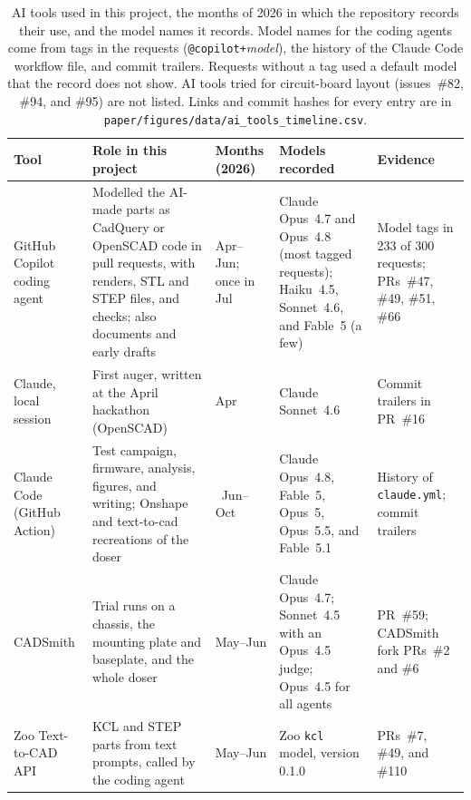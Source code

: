 \begin{table}[htbp]
\centering
\small
\caption{AI tools used in this project, the months of 2026 in which the
repository records their use, and the model names it records. Model names for
the coding agents come from tags in the requests (\texttt{@copilot+}\emph{model}),
the history of the Claude Code workflow file, and commit trailers. Requests
without a tag used a default model that the record does not show. AI tools tried
for circuit-board layout (issues~\#82, \#94, and \#95) are not listed. Links and
commit hashes for every entry are in
\texttt{paper/figures/data/ai\_tools\_timeline.csv}.}
\label{tbl:aitools}
\begin{tabular}{>{\raggedright\arraybackslash}p{2.5cm}>{\raggedright\arraybackslash}p{4.2cm}>{\raggedright\arraybackslash}p{1.7cm}>{\raggedright\arraybackslash}p{3.4cm}>{\raggedright\arraybackslash}p{2.5cm}}
\toprule
Tool & Role in this project & Months (2026) & Models recorded & Evidence \\
\midrule
GitHub Copilot coding agent & Modelled the AI-made parts as CadQuery or
OpenSCAD code in pull requests, with renders, STL and STEP files, and checks;
also documents and early drafts & Apr--Jun; once in Jul & Claude Opus~4.7 and
Opus~4.8 (most tagged requests); Haiku~4.5, Sonnet~4.6, and Fable~5 (a few) &
Model tags in 233 of 300 requests; PRs~\#47, \#49, \#51, \#66 \\
\addlinespace[2pt]
Claude, local session & First auger, written at the April hackathon
(OpenSCAD) & Apr & Claude Sonnet~4.6 & Commit trailers in PR~\#16 \\
\addlinespace[2pt]
Claude Code (GitHub Action) & Test campaign, firmware, analysis, figures, and
writing; Onshape and text-to-cad recreations of the doser & 30~Jun--Oct &
Claude Opus~4.8, Fable~5, Opus~5, Opus~5.5, and Fable~5.1 & History of
\texttt{claude.yml}; commit trailers \\
\addlinespace[2pt]
CADSmith & Trial runs on a chassis, the mounting plate and baseplate, and the
whole doser & May--Jun & Claude Opus~4.7; Sonnet~4.5 with an Opus~4.5 judge;
Opus~4.5 for all agents & PR~\#59; CADSmith fork PRs~\#2 and \#6 \\
\addlinespace[2pt]
Zoo Text-to-CAD API & KCL and STEP parts from text prompts, called by the
coding agent & May--Jun & Zoo \texttt{kcl} model, version 0.1.0 & PRs~\#7,
\#49, and \#110 \\

\end{tabular}
\end{table}
